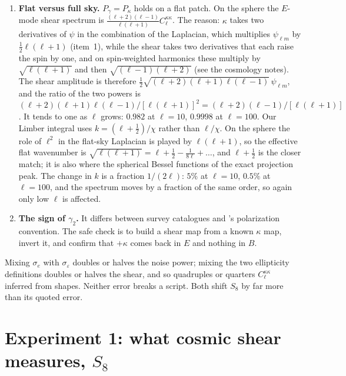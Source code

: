 \begin{enumerate}[leftmargin=1.6em,itemsep=3pt]
\item \textbf{Flat versus full sky.} $P_\gamma=P_\kappa$ holds on a flat patch. On the sphere the $E$-mode shear spectrum is $\frac{(\ell+2)(\ell-1)}{\ell(\ell+1)}C_\ell^{\kappa\kappa}$. The reason: $\kappa$ takes two derivatives of $\psi$ in the combination of the Laplacian, which multiplies $\psi_{\ell m}$ by $\frac12\ell(\ell+1)$ (item~1), while the shear takes two derivatives that each raise the spin by one, and on spin-weighted harmonics these multiply by $\sqrt{\ell(\ell+1)}$ and then $\sqrt{(\ell-1)(\ell+2)}$ (see the cosmology notes). The shear amplitude is therefore $\frac12\sqrt{(\ell+2)(\ell+1)\ell(\ell-1)}\,\psi_{\ell m}$, and the ratio of the two powers is $(\ell+2)(\ell+1)\ell(\ell-1)/[\ell(\ell+1)]^2=(\ell+2)(\ell-1)/[\ell(\ell+1)]$. It tends to one as $\ell$ grows: $0.982$ at $\ell=10$, $0.9998$ at $\ell=100$. Our Limber integral uses $k=(\ell+\frac12)/\chi$ rather than $\ell/\chi$. On the sphere the role of $\ell^2$ in the flat-sky Laplacian is played by $\ell(\ell+1)$, so the effective flat wavenumber is $\sqrt{\ell(\ell+1)}=\ell+\frac12-\frac1{8\ell}+\dots$, and $\ell+\frac12$ is the closer match; it is also where the spherical Bessel functions of the exact projection peak. The change in $k$ is a fraction $1/(2\ell)$: $5\%$ at $\ell=10$, $0.5\%$ at $\ell=100$, and the spectrum moves by a fraction of the same order, so again only low $\ell$ is affected.
\item \textbf{The sign of $\gamma_2$.} It differs between survey catalogues and 's polarization convention. The safe check is to build a shear map from a known $\kappa$ map, invert it, and confirm that $+\kappa$ comes back in $E$ and nothing in $B$.
\end{enumerate}

\begin{pitfall}
Mixing $\sigma_e$ with $\sigma_\varepsilon$ doubles or halves the noise power; mixing the two ellipticity definitions doubles or halves the shear, and so quadruples or quarters $C_\ell^{\kappa\kappa}$ inferred from shapes. Neither error breaks a script. Both shift $S_8$ by far more than its quoted error.
\end{pitfall}

\section{Experiment 1: what cosmic shear measures, \texorpdfstring{$S_8$}{S8}}
\label{T1b:sec:s8}

